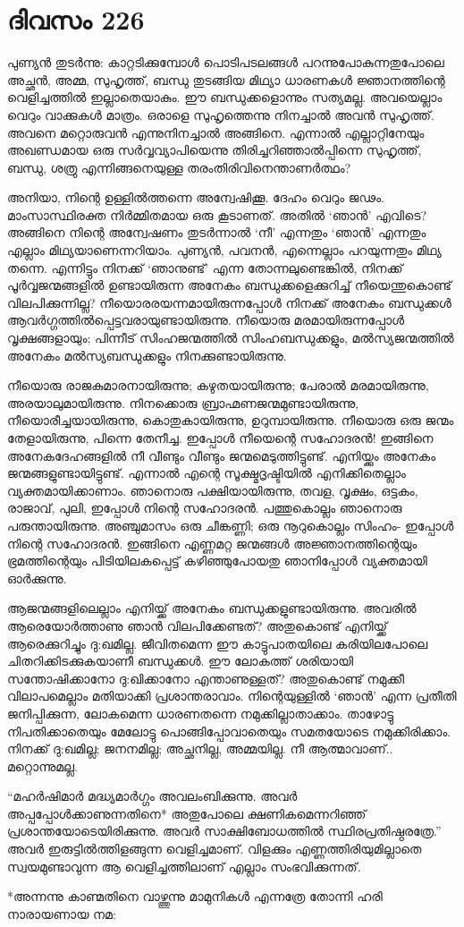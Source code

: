 \section{ദിവസം 226}


പുണ്യൻ തുടർന്നു: കാറ്റടിക്കുമ്പോൾ പൊടിപടലങ്ങൾ പറന്നുപോകുന്നതുപോലെ അച്ഛൻ, അമ്മ, സുഹൃത്ത്, ബന്ധു തുടങ്ങിയ മിഥ്യാ ധാരണകൾ ജ്ഞാനത്തിന്റെ വെളിച്ചത്തിൽ ഇല്ലാതെയാകും. ഈ ബന്ധുക്കളൊന്നും സത്യമല്ല. അവയെല്ലാം വെറും വാക്കുകൾ മാത്രം. ഒരാളെ സുഹൃത്തെന്നു നിനച്ചാൽ അവൻ സുഹൃത്ത്. അവനെ മറ്റൊരുവൻ എന്നുനിനച്ചാൽ അങ്ങിനെ. എന്നാൽ എല്ലാറ്റിനേയും അഖണ്ഡമായ ഒരു സർവ്വവ്യാപിയെന്നു തിരിച്ചറിഞ്ഞാൽപ്പിന്നെ സുഹൃത്ത്, ബന്ധു, ശത്രു എന്നിങ്ങനെയുള്ള തരംതിരിവിനെന്താണർത്ഥം?

അനിയാ, നിന്റെ ഉള്ളിൽത്തന്നെ അന്വേഷിക്കൂ. ദേഹം വെറും ജഢം. മാംസാസ്ഥിരക്ത നിര്‍മ്മിതമായ ഒരു കൂടാണത്. അതിൽ ‘ഞാൻ’ എവിടെ? അങ്ങിനെ നിന്റെ അന്വേഷണം തുടർന്നാൽ ‘നീ’ എന്നതും ‘ഞാൻ’ എന്നതും എല്ലാം മിഥ്യയാണെന്നറിയാം. പുണ്യൻ, പവനൻ, എന്നെല്ലാം പറയുന്നതും മിഥ്യ തന്നെ. എന്നിട്ടും നിനക്ക് ‘ഞാനുണ്ട്’ എന്ന തോന്നലുണ്ടെങ്കിൽ, നിനക്ക് പൂർവ്വജന്മങ്ങളിൽ ഉണ്ടായിരുന്ന അനേകം ബന്ധുക്കളെക്കുറിച്ച് നീയെന്തുകൊണ്ട് വിലപിക്കുന്നില്ല? നീയൊരരയന്നമായിരുന്നപ്പോൾ നിനക്ക് അനേകം ബന്ധുക്കൾ ആവർഗ്ഗത്തിൽപ്പെട്ടവരായുണ്ടായിരുന്നു. നീയൊരു മരമായിരുന്നപ്പോൾ വൃക്ഷങ്ങളായും; പിന്നീട് സിംഹജന്മത്തിൽ സിംഹബന്ധുക്കളും, മൽസ്യജന്മത്തിൽ അനേകം മൽസ്യബന്ധുക്കളും നിനക്കുണ്ടായിരുന്നു.

നീയൊരു രാജകുമാരനായിരുന്നു; കഴുതയായിരുന്നു; പേരാൽ മരമായിരുന്നു, അരയാലുമായിരുന്നു. നിനക്കൊരു ബ്രാഹ്മണജന്മമുണ്ടായിരുന്നു, നീയൊരീച്ചയായിരുന്നു, കൊതുകായിരുന്നു, ഉറുമ്പായിരുന്നു. നീയൊരു ഒരു ജന്മം തേളായിരുന്നു, പിന്നെ തേനീച്ച. ഇപ്പോള്‍ നീയെന്റെ സഹോദരൻ! ഇങ്ങിനെ അനേകദേഹങ്ങളിൽ നീ വീണ്ടും വീണ്ടും ജന്മമെടുത്തിട്ടുണ്ട്. എനിയ്ക്കും അനേകം ജന്മങ്ങളുണ്ടായിട്ടുണ്ട്. എന്നാല്‍ എന്റെ സൂക്ഷ്മദൃഷ്ടിയിൽ എനിക്കിതെല്ലാം വ്യക്തമായിക്കാണാം. ഞാനൊരു പക്ഷിയായിരുന്നു, തവള, വൃക്ഷം, ഒട്ടകം, രാജാവ്, പുലി, ഇപ്പോൾ നിന്റെ സഹോദരൻ. പത്തുകൊല്ലം ഞാനൊരു പരുന്തായിരുന്നു. അഞ്ചുമാസം ഒരു ചീങ്കണ്ണി; ഒരു നൂറുകൊല്ലം സിംഹം- ഇപ്പോള്‍ നിന്റെ സഹോദരൻ. ഇങ്ങിനെ എണ്ണമറ്റ ജന്മങ്ങൾ അജ്ഞാനത്തിന്റെയും ഭ്രമത്തിന്റെയും പിടിയിലകപ്പെട്ട് കഴിഞ്ഞുപോയതു ഞാനിപ്പോള്‍ വ്യക്തമായി ഓർക്കുന്നു.

ആജന്മങ്ങളിലെല്ലാം എനിയ്ക്ക് അനേകം ബന്ധുക്കളുണ്ടായിരുന്നു. അവരില്‍ ആരെയോർത്താണു ഞാൻ വിലപിക്കേണ്ടത്? അതുകൊണ്ട് എനിയ്ക്ക് ആരെക്കുറിച്ചും ദു:ഖമില്ല. ജീവിതമെന്ന ഈ കാട്ടുപാതയിലെ കരിയിലപോലെ ചിതറിക്കിടക്കുകയാണീ ബന്ധുക്കൾ. ഈ ലോകത്ത് ശരിയായി സന്തോഷിക്കാനോ ദു:ഖിക്കാനോ എന്താണുള്ളത്? അതുകൊണ്ട് നമുക്കീ വിലാപമെല്ലാം മതിയാക്കി പ്രശാന്തരാവാം. നിന്റെയുള്ളിൽ ‘ഞാൻ’ എന്ന പ്രതീതി ജനിപ്പിക്കുന്ന, ലോകമെന്ന ധാരണതന്നെ നമുക്കില്ലാതാക്കാം. താഴോട്ടു നിപതിക്കാതെയും മേലോട്ടു പൊങ്ങിപ്പോവാതെയും സമതയോടെ നമുക്കിരിക്കാം. നിനക്ക് ദു:ഖമില്ല; ജനനമില്ല; അച്ഛനില്ല, അമ്മയില്ല. നീ ആത്മാവാണ്‌.. മറ്റൊന്നുമല്ല.

“മഹർഷിമാർ മദ്ധ്യമാർഗ്ഗം അവലംബിക്കുന്നു. അവർ അപ്പപ്പോൾക്കാണുന്നതിനെ* അതുപോലെ ക്ഷണികമെന്നറിഞ്ഞ് പ്രശാന്തയോടെയിരിക്കുന്നു. അവർ സാക്ഷിബോധത്തിൽ സ്ഥിരപ്രതിഷ്ഠരത്രേ.” അവർ ഇരുട്ടിൽത്തിളങ്ങുന്ന വെളിച്ചമാണ്‌. വിളക്കും എണ്ണത്തിരിയുമില്ലാതെ സ്വയമുണ്ടാവുന്ന ആ വെളിച്ചത്തിലാണ്‌ എല്ലാം സംഭവിക്കുന്നത്.

*അന്നന്നു കാണ്മതിനെ വാഴ്ത്തുന്നു മാമുനികള്‍ എന്നത്രേ തോന്നി ഹരി നാരായണായ നമ:
